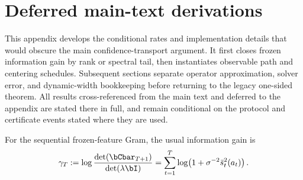 \section{Deferred main-text derivations}\label{app:deferred}
This appendix develops the conditional rates and implementation details that
would obscure the main confidence-transport argument.  It first closes frozen
information gain by rank or spectral tail, then instantiates observable path
and centering schedules.  Subsequent sections separate operator approximation,
solver error, and dynamic-width bookkeeping before returning to the legacy
one-sided theorem.  All results cross-referenced from the main text and deferred
to the appendix are stated there in full, and remain conditional on the protocol
and certificate events stated where they are used.

For the sequential frozen-feature Gram, the usual information gain is
\begin{equation}\label{eq:infogain}
\gamma_T:=\log\frac{\det(\bCbar_{T+1})}{\det(\lambda\bI)}
=\sum_{t=1}^T\log\!\left(1+\sigma^{-2}\bar s_t^2(a_t)\right).
\end{equation}


